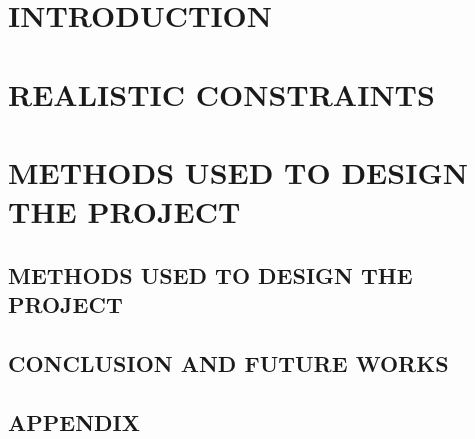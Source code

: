 \documentclass[a4paper,12pt]{extreport}
\begin{document}
\part{INTRODUCTION}



\part{REALISTIC CONSTRAINTS}
\part{METHODS USED TO DESIGN THE PROJECT}


\newpage
\chapter{METHODS USED TO DESIGN THE PROJECT }

\newpage
\chapter{CONCLUSION AND FUTURE WORKS}

\newpage
\chapter*{APPENDIX}



\end{document}
